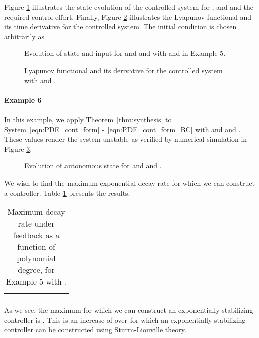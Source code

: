 \documentclass[9pt,journal,twocolumn]{IEEEtran}
\begin{document}
Figure \ref{fig:control_control} illustrates the state evolution of the controlled system for ,  and  and the required control effort. Finally, Figure \ref{fig:V_control} illustrates the Lyapunov functional and its time derivative for the controlled system. The initial condition is chosen arbitrarily as 


\begin{figure}[h!]
\centering
{}
\quad
{}
\caption{Evolution of state and input for  and  and  with  and  in Example 5.}
\label{fig:control_control}
\end{figure}

\begin{figure}[h!]
\centering
{}
\quad
{}
\caption{Lyapunov functional and its derivative for the controlled system with  and .}
\label{fig:V_control}
\end{figure}


\paragraph*{Example 6} In this example, we apply Theorem~\ref{thm:synthesis} to System~\eqref{eqn:PDE_cont_form} -~\eqref{eqn:PDE_cont_form_BC} with  and  and . These values render the system unstable as verified by numerical simulation in Figure \ref{fig:control_auto}.
\begin{figure}[h!]
\centering
{}
\quad
{}
\caption{Evolution of autonomous state for  and  and .}
\label{fig:control_auto}
\end{figure}
We wish to find the maximum exponential decay rate  for which we can construct a controller. Table \ref{table_synthesis_2} presents the results. 
\begin{table}[h]
\begin{center}
    \begin{tabular}{l *{7}{c}}\hline \hline
  &  &  &  &  \\ \hline
 &   &  &  &  \\
\end{tabular}
\end{center}
\caption{Maximum decay rate  under feedback as a function of polynomial degree,  for Example 5 with .}
\label{table_synthesis_2}
\end{table}
As we see, the maximum  for which we can construct an exponentially stabilizing controller is . This is an increase of  over  for which an exponentially stabilizing controller can be constructed using Sturm-Liouville theory.
\end{document}

